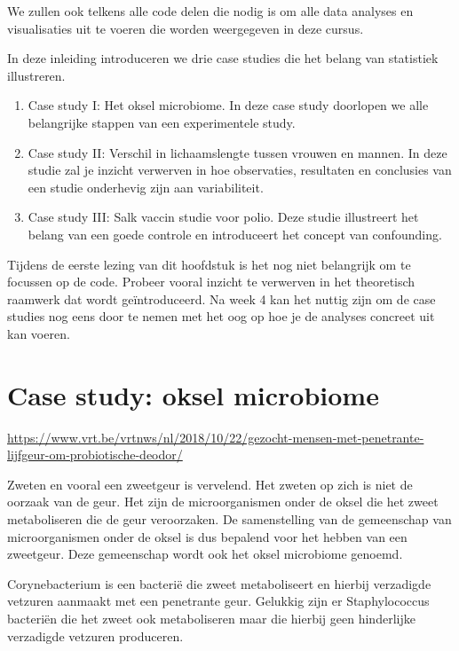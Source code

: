 \documentclass[
  12pt,dutch,coursenotes]{book}
\theoremstyle{definition}
\theoremstyle{definition}
\theoremstyle{definition}
\theoremstyle{definition}
\theoremstyle{remark}
\begin{document}
We zullen ook telkens alle code delen die nodig is om alle data analyses en visualisaties uit te voeren die worden weergegeven in deze cursus.

In deze inleiding introduceren we drie case studies die het belang van statistiek illustreren.

\begin{enumerate}
\def\labelenumi{\arabic{enumi}.}
\item
  Case study I: Het oksel microbiome. In deze case study doorlopen we alle belangrijke stappen van een experimentele study.
\item
  Case study II: Verschil in lichaamslengte tussen vrouwen en mannen. In deze studie zal je inzicht verwerven in hoe observaties, resultaten en conclusies van een studie onderhevig zijn aan variabiliteit.
\item
  Case study III: Salk vaccin studie voor polio. Deze studie illustreert het belang van een goede controle en introduceert het concept van confounding.
\end{enumerate}

Tijdens de eerste lezing van dit hoofdstuk is het nog niet belangrijk om te focussen op de code. Probeer vooral inzicht te verwerven in het theoretisch raamwerk dat wordt geïntroduceerd. Na week 4 kan het nuttig zijn om de case studies nog eens door te nemen met het oog op hoe je de analyses concreet uit kan voeren.

\hypertarget{case-study-oksel-microbiome}{%
\section{Case study: oksel microbiome}\label{case-study-oksel-microbiome}}

\url{https://www.vrt.be/vrtnws/nl/2018/10/22/gezocht-mensen-met-penetrante-lijfgeur-om-probiotische-deodor/}

Zweten en vooral een zweetgeur is vervelend.
Het zweten op zich is niet de oorzaak van de geur.
Het zijn de microorganismen onder de oksel die het zweet metaboliseren die de geur veroorzaken.
De samenstelling van de gemeenschap van microorganismen onder de oksel is dus bepalend voor het hebben van een zweetgeur.
Deze gemeenschap wordt ook het oksel microbiome genoemd.

Corynebacterium is een bacterië die zweet metaboliseert en hierbij verzadigde vetzuren aanmaakt met een penetrante geur.
Gelukkig zijn er Staphylococcus bacteriën die het zweet ook metaboliseren maar die hierbij geen hinderlijke verzadigde vetzuren produceren.
\end{document}
